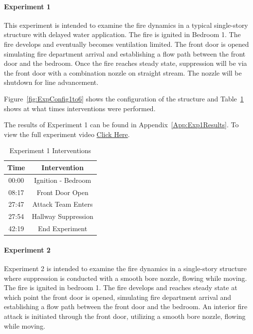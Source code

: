 \documentclass[12pt,oneside]{book}
\begin{document}
\clearpage

\paragraph{Experiment 1} \mbox{}

This experiment is intended to examine the fire dynamics in a typical single-story structure with delayed water application. The fire is ignited in Bedroom 1. The fire develops and eventually becomes ventilation limited. The front door is opened simulating fire department arrival and establishing a flow path between the front door and the bedroom. Once the fire reaches steady state, suppression will be via the front door with a combination nozzle on straight stream. The nozzle will be shutdown for line advancement. 

Figure~\ref{fig:ExpConfig1to6} shows the configuration of the structure and Table~\ref{Table:Exp1Interventions} shows at what times interventions were performed. 

The results of Experiment 1 can be found in Appendix~\ref{App:Exp1Results}. To view the full experiment video \href{https://youtu.be/gl8rc1Nsl1k}{Click Here}.

\begin{table}[H]
	\centering
	\caption{Experiment 1 Interventions}
	\begin{tabular}{|c|c|} 
		\hline
		Time & Intervention \\ \hline \hline
		00:00 & Ignition - Bedroom \\ \hline
		08:17 & Front Door Open \\ \hline
		27:47 & Attack Team Enters\\ \hline
		27:54 & Hallway Suppression \\ \hline
		42:19 & End Experiment\\ \hline
	\end{tabular}
	\label{Table:Exp1Interventions}
\end{table}

\clearpage

\paragraph{Experiment 2} \mbox{}

Experiment 2 is intended to examine the fire dynamics in a single-story structure where suppression is conducted with a smooth bore nozzle, flowing while moving. The fire is ignited in bedroom 1. The fire develops and reaches steady state at which point the front door is opened, simulating fire department arrival and establishing a flow path between the front door and the bedroom. An interior fire attack is initiated through the front door, utilizing a smooth bore nozzle, flowing while moving. 
\end{document}
